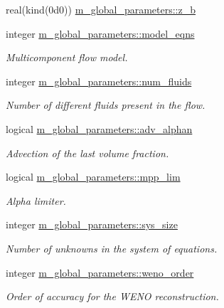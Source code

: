\begin{DoxyCompactItemize}
\item 
real(kind(0d0)) \hyperlink{namespacem__global__parameters_accc52011bfc1383c99125f030792ba6b}{m\+\_\+global\+\_\+parameters\+::z\+\_\+b}
\item 
integer \hyperlink{namespacem__global__parameters_a6cf2e92cfc3b519fb6da6fe9e88fab31}{m\+\_\+global\+\_\+parameters\+::model\+\_\+eqns}
\begin{DoxyCompactList}\small\item\em Multicomponent flow model. \end{DoxyCompactList}\item 
integer \hyperlink{namespacem__global__parameters_a2f0b96a5aef3925aa7e3cc816754e17e}{m\+\_\+global\+\_\+parameters\+::num\+\_\+fluids}
\begin{DoxyCompactList}\small\item\em Number of different fluids present in the flow. \end{DoxyCompactList}\item 
logical \hyperlink{namespacem__global__parameters_abebd95d9d0271fbda40f47f75a2d829b}{m\+\_\+global\+\_\+parameters\+::adv\+\_\+alphan}
\begin{DoxyCompactList}\small\item\em Advection of the last volume fraction. \end{DoxyCompactList}\item 
logical \hyperlink{namespacem__global__parameters_adc35ba450a192812db36f1d6659d64e6}{m\+\_\+global\+\_\+parameters\+::mpp\+\_\+lim}
\begin{DoxyCompactList}\small\item\em Alpha limiter. \end{DoxyCompactList}\item 
integer \hyperlink{namespacem__global__parameters_a4dac2e4ead915635e0c6c33af87be01b}{m\+\_\+global\+\_\+parameters\+::sys\+\_\+size}
\begin{DoxyCompactList}\small\item\em Number of unknowns in the system of equations. \end{DoxyCompactList}\item 
integer \hyperlink{namespacem__global__parameters_ab8488205257dab4e94258eee55d0d1aa}{m\+\_\+global\+\_\+parameters\+::weno\+\_\+order}
\begin{DoxyCompactList}\small\item\em Order of accuracy for the W\+E\+NO reconstruction. \end{DoxyCompactList}\item 

\end{DoxyCompactItemize}
